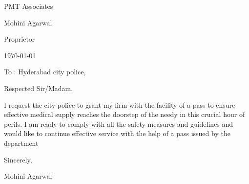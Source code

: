 \documentclass{article}
\begin{document}
\hspace*{0.9\linewidth}
\begin{minipage}{0.4\linewidth}
PMT Associates\par
Mohini Agarwal\par
Proprietor\par
\today
\end{minipage}
\vspace{10mm}

To : Hyderabad city police,  \par \bigskip

Respected Sir/Madam,  \par \bigskip

I request the city police to grant my firm with the facility of a pass to ensure effective medical supply reaches the doorstep of the needy in this crucial hour of perils. I am ready to comply with all the safety measures and guidelines and would like to continue effective service with the help of a pass issued by the department \par \bigskip


Sincerely, \par \smallskip
Mohini Agarwal 


\par
\end{document}
